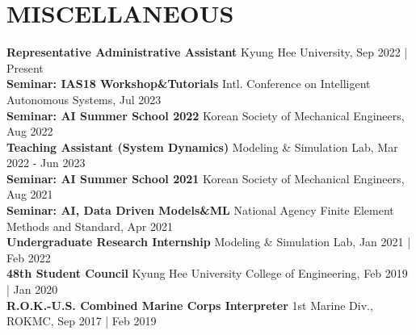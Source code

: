 \documentclass[a4paper,10pt]{extarticle}
\begin{document}
\section*{MISCELLANEOUS}
\textbf{Representative Administrative Assistant} \hfill Kyung Hee University, Sep 2022 | Present\\
\textbf{Seminar: IAS18 Workshop\&Tutorials} \hfill {\small Intl. Conference on Intelligent Autonomous Systems}, Jul 2023\\
\textbf{Seminar: AI Summer School 2022} \hfill Korean Society of Mechanical Engineers, Aug 2022\\
\textbf{Teaching Assistant (System Dynamics)} \hfill Modeling \& Simulation Lab, Mar 2022 - Jun 2023\\
\textbf{Seminar: AI Summer School 2021} \hfill Korean Society of Mechanical Engineers, Aug 2021\\
\textbf{Seminar: AI, Data Driven Models\&ML} \hfill {\small National Agency Finite Element Methods and Standard}, Apr 2021\\
\textbf{Undergraduate Research Internship} \hfill Modeling \& Simulation Lab, Jan 2021 | Feb 2022\\
\textbf{48th Student Council} \hfill Kyung Hee University College of Engineering, Feb 2019 | Jan 2020\\
\textbf{R.O.K.-U.S. Combined Marine Corps Interpreter} \hfill 1st Marine Div., ROKMC, Sep 2017 | Feb 2019\\
\end{document}
